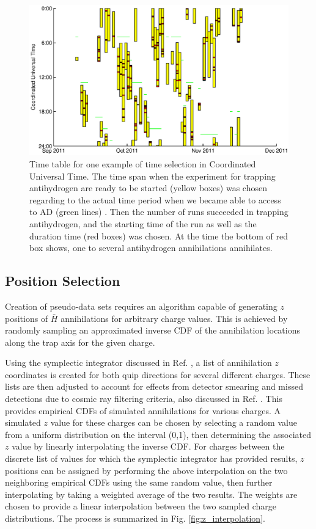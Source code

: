 \documentclass[superscriptaddress,aps,prb,11pt]{revtex4-1}
\begin{document}
\begin{figure}
  \includegraphics[scale=0.6]{eventTime_sim_example.eps}
  \caption{Time table for one example of time selection in Coordinated Universal Time. The time span when the experiment for trapping antihydrogen are ready to be started (yellow boxes) was chosen regarding to the actual time period when we became able to access to AD (green lines) . Then the number of runs succeeded in trapping antihydrogen, and the starting time  of the run as well as the duration time (red boxes) was chosen. At the time the bottom of red box shows, one to several antihydrogen annihilations annihilates.}
  \label{fig:eventTime_date_sim}
\end{figure}



\subsection*{Position Selection}
Creation of pseudo-data sets requires an algorithm capable of generating $z$ positions of $\bar{H}$ annihilations for arbitrary charge values.  This is achieved by randomly sampling an approximated inverse CDF of the annihilation locations along the trap axis for the given charge.

Using the symplectic integrator discussed in Ref. , a list of annihilation $z$ coordinates is created for both quip directions for several different charges.  These lists are then adjusted to account for effects from detector smearing and missed detections due to cosmic ray filtering criteria, also discussed in Ref. .  This provides empirical CDFs of simulated annihilations for various charges.  A simulated $z$ value for these charges can be chosen by selecting a random value from a uniform distribution on the interval (0,1), then determining the associated $z$ value by linearly interpolating the inverse CDF.  For charges between the discrete list of values for which the symplectic integrator has provided results, $z$ positions can be assigned by performing the above interpolation on the two neighboring empirical CDFs using the same random value, then further interpolating by taking a weighted average of the two results.  The weights are chosen to provide a linear interpolation between the two sampled charge distributions.  The process is summarized in Fig. \ref{fig:z_interpolation}.
\end{document}
